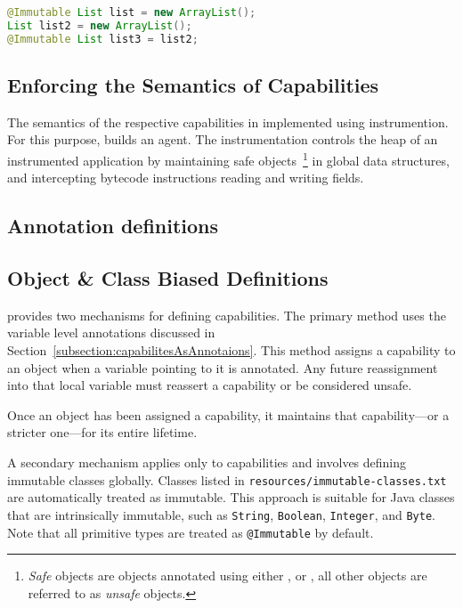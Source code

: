 \documentclass[JDala.tex]{subfiles}
\begin{document}
\begin{lstlisting}[language=Java, caption=Associating objects with capabilities, label=listing:annotation]
@Immutable List list = new ArrayList();
List list2 = new ArrayList();
@Immutable List list3 = list2;
\end{lstlisting}


\subsection{Enforcing the Semantics of Capabilities}

The semantics of the respective capabilities in implemented using instrumention. For this purpose, \jdala builds an agent. The instrumentation controls the heap of an instrumented application by maintaining safe objects~\footnote{\textit{Safe} objects are objects annotated using either \Immutable, \Isolated or \Local, all other objects are referred to as \textit{unsafe} objects.} in global data structures, and intercepting bytecode instructions reading and writing fields. 
	


\subsection{Annotation definitions}

\subsection{Object \& Class Biased Definitions}



\jdala provides two mechanisms for defining capabilities. The primary method uses the variable level annotations discussed in Section~\ref{subsection:capabilitesAsAnnotaions}. This method assigns a capability to an object when a variable pointing to it is annotated. Any future reassignment into that local variable must reassert a capability or be considered unsafe.

Once an object has been assigned a capability, it maintains that capability—or a stricter one—for its entire lifetime.

A secondary mechanism applies only to \Immutable capabilities and involves defining immutable classes globally. Classes listed in \texttt{resources/immutable-classes.txt} are automatically treated as immutable. This approach is suitable for Java classes that are intrinsically immutable, such as \texttt{String}, \texttt{Boolean}, \texttt{Integer}, and \texttt{Byte}. Note that all primitive types are treated as \texttt{@Immutable} by default.
\end{document}
